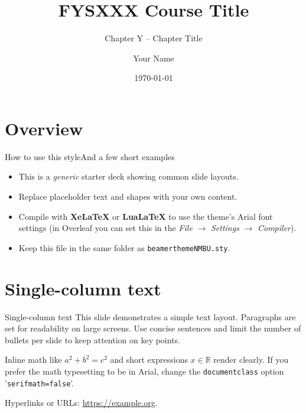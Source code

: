 \documentclass[10pt, aspectratio=169]{beamer}
\title{FYSXXX Course Title}
\subtitle{Chapter Y -- Chapter Title}
\author{Your Name}
\date{\today}
\begin{document}
\begin{frame}  %
  \titlepage
\end{frame}

\section*{Overview}
\begin{frame}[t]{How to use this style}{And a few short examples}
\begin{itemize}
  \item This is a \emph{generic} starter deck showing common slide layouts.
  \item Replace placeholder text and shapes with your own content.
  \item Compile with \textbf{XeLaTeX} or \textbf{LuaLaTeX} to use the theme's Arial font settings (in Overleaf you can set this in the \textit{File} \(\to\) \textit{Settings} \(\to\) \textit{Compiler}).
  \item Keep this file in the same folder as \texttt{beamerthemeNMBU.sty}.
\end{itemize}
\end{frame}

\section{Single-column text}
\begin{frame}[t,leftlogo]{Single-column text}
This slide demonstrates a simple text layout.
Paragraphs are set for readability on large screens.
Use concise sentences and limit the number of bullets per slide to keep attention on key points.

Inline math like \(a^2+b^2=c^2\) and short expressions \(x \in \mathbb{R}\) render clearly.
If you prefer the math typesetting to be in Arial, change the \texttt{documentclass} option '\texttt{serifmath=false}'.


Hyperlinks or URLs: \url{https://example.org}.
\end{frame}

\end{document}
